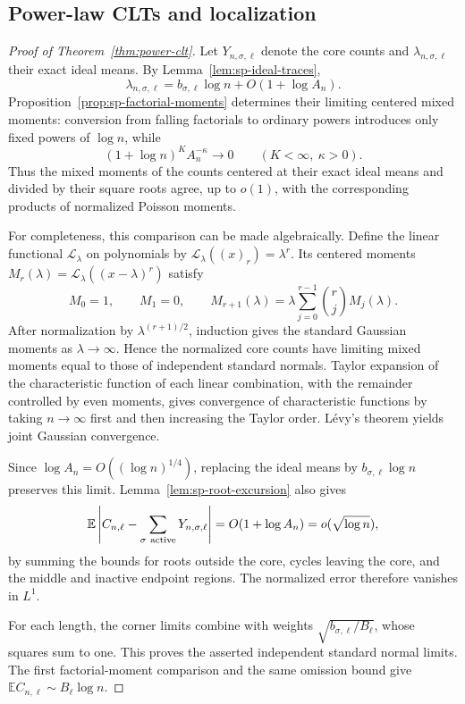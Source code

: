 \documentclass[11pt]{article}
\theoremstyle{remark}
\theoremstyle{plain}
\newcommand{\E}{\mathbb E}
\begin{document}
\subsection{Power-law CLTs and localization}
\label{subsec:sp-power-conclusions}

\begin{proof}[Proof of Theorem~\ref{thm:power-clt}]
Let $Y_{n,\sigma,\ell}$ denote the core counts and
$\lambda_{n,\sigma,\ell}$ their exact ideal means.  By
Lemma~\ref{lem:sp-ideal-traces},
\[
 \lambda_{n,\sigma,\ell}
 =b_{\sigma,\ell}\log n+O(1+\log A_n).
\]
Proposition~\ref{prop:sp-factorial-moments} determines their limiting
centered mixed moments: conversion from falling factorials to ordinary
powers introduces only fixed powers of $\log n$, while
\[
 (1+\log n)^K A_n^{-\kappa}\longrightarrow0
 \qquad(K<\infty,\ \kappa>0).
\]
Thus the mixed moments of the counts centered at their exact ideal
means and divided by their square roots agree, up to $o(1)$, with the
corresponding products of normalized Poisson moments.

For completeness, this comparison can be made algebraically.  Define
the linear functional $\mathcal L_\lambda$ on polynomials by
$\mathcal L_\lambda((x)_r)=\lambda^r$.  Its centered moments
$M_r(\lambda)=\mathcal L_\lambda((x-\lambda)^r)$ satisfy
\[
 M_0=1,\qquad M_1=0,\qquad
 M_{r+1}(\lambda)
 =\lambda\sum_{j=0}^{r-1}\binom{r}{j}M_j(\lambda).
\]
After normalization by $\lambda^{(r+1)/2}$, induction gives the standard
Gaussian moments as $\lambda\to\infty$.  Hence the normalized core
counts have limiting mixed moments equal to those of independent
standard normals.  Taylor expansion of the characteristic function of
each linear combination, with the remainder controlled by even moments,
gives convergence of characteristic functions by taking $n\to\infty$
first and then increasing the Taylor order.  L\'evy's theorem yields
joint Gaussian convergence.

Since $\log A_n=O((\log n)^{1/4})$, replacing the ideal means by
$b_{\sigma,\ell}\log n$ preserves this limit.
Lemma~\ref{lem:sp-root-excursion} also gives
\[
 \E\left|C_{n,\ell}-\sum_{\sigma\ {\rm active}}
 Y_{n,\sigma,\ell}\right|
 =O(1+\log A_n)=o(\sqrt{\log n}),
\]
by summing the bounds for roots outside the core, cycles leaving the
core, and the middle and inactive endpoint regions.  The normalized
error therefore vanishes in $L^1$.

For each length, the corner limits combine with weights
$\sqrt{b_{\sigma,\ell}/B_\ell}$, whose squares sum to one.  This proves
the asserted independent standard normal limits.  The first
factorial-moment comparison and the same omission bound give
$\E C_{n,\ell}\sim B_\ell\log n$.
\end{proof}
\end{document}
